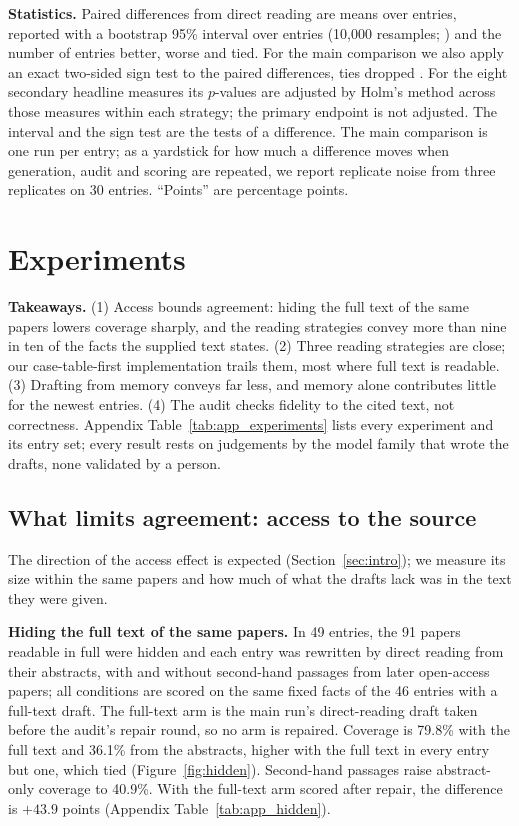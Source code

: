 \documentclass{article} %
\begin{document}
\textbf{Statistics.} Paired differences from direct reading are means over entries, reported with a bootstrap 95\% interval over entries (10,000 resamples; \citealp{Efron1979BootstrapMethods}) and the number of entries better, worse and tied. For the main comparison we also apply an exact two-sided sign test to the paired differences, ties dropped \citep{Dixon1946StatisticalSign}. For the eight secondary headline measures its $p$-values are adjusted by Holm's method \citep{holm1979simple} across those measures within each strategy; the primary endpoint is not adjusted. The interval and the sign test are the tests of a difference. The main comparison is one run per entry; as a yardstick for how much a difference moves when generation, audit and scoring are repeated, we report replicate noise from three replicates on 30 entries. ``Points'' are percentage points.

\section{Experiments}
\label{sec:experiments}
\textbf{Takeaways.} (1) Access bounds agreement: hiding the full text of the same papers lowers coverage sharply, and the reading strategies convey more than nine in ten of the facts the supplied text states. (2) Three reading strategies are close; our case-table-first implementation trails them, most where full text is readable. (3) Drafting from memory conveys far less, and memory alone contributes little for the newest entries. (4) The audit checks fidelity to the cited text, not correctness. Appendix Table~\ref{tab:app_experiments} lists every experiment and its entry set; every result rests on judgements by the model family that wrote the drafts, none validated by a person.

\subsection{What limits agreement: access to the source}
\label{sec:access}
The direction of the access effect is expected (Section~\ref{sec:intro}); we measure its size within the same papers and how much of what the drafts lack was in the text they were given.

\textbf{Hiding the full text of the same papers.} In 49 entries, the 91 papers readable in full were hidden and each entry was rewritten by direct reading from their abstracts, with and without second-hand passages from later open-access papers; all conditions are scored on the same fixed facts of the 46 entries with a full-text draft. The full-text arm is the main run's direct-reading draft taken before the audit's repair round, so no arm is repaired. Coverage is 79.8\% with the full text and 36.1\% from the abstracts, higher with the full text in every entry but one, which tied (Figure~\ref{fig:hidden}). Second-hand passages raise abstract-only coverage to 40.9\%. With the full-text arm scored after repair, the difference is $+43.9$ points (Appendix Table~\ref{tab:app_hidden}).
\end{document}
